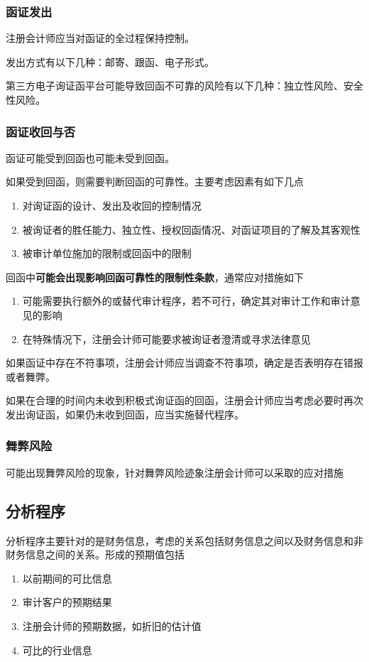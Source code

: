 \documentclass[UTF8,12pt]{ctexart}
\numberwithin{equation}{section} %
\numberwithin{figure}{section}
\numberwithin{table}{section}
\begin{document}
	\subsubsection{函证发出}
	注册会计师应当对函证的全过程保持控制。
	
	发出方式有以下几种：邮寄、跟函、电子形式。
	
	第三方电子询证函平台可能导致回函不可靠的风险有以下几种：独立性风险、安全性风险。
	
	\subsubsection{函证收回与否}
	函证可能受到回函也可能未受到回函。
	
	如果受到回函，则需要判断回函的可靠性。主要考虑因素有如下几点
	\begin{enumerate}
		\item 对询证函的设计、发出及收回的控制情况
		
		\item 被询证者的胜任能力、独立性、授权回函情况、对函证项目的了解及其客观性
		
		\item 被审计单位施加的限制或回函中的限制
	\end{enumerate}
	
	回函中\textbf{可能会出现影响回函可靠性的限制性条款}，通常应对措施如下
	\begin{enumerate}
		\item 可能需要执行额外的或替代审计程序，若不可行，确定其对审计工作和审计意见的影响
		
		\item 在特殊情况下，注册会计师可能要求被询证者澄清或寻求法律意见
	\end{enumerate}
	
	如果函证中存在不符事项，注册会计师应当调查不符事项，确定是否表明存在错报或者舞弊。
	
	如果在合理的时间内未收到积极式询证函的回函，注册会计师应当考虑必要时再次发出询证函，如果仍未收到回函，应当实施替代程序。
	
	\subsubsection{舞弊风险}
	
	可能出现舞弊风险的现象，针对舞弊风险迹象注册会计师可以采取的应对措施
	
	\subsection{分析程序}
	分析程序主要针对的是财务信息，考虑的关系包括财务信息之间以及财务信息和非财务信息之间的关系。形成的预期值包括
	\begin{enumerate}
		\item 以前期间的可比信息
		
		\item 审计客户的预期结果
		
		\item 注册会计师的预期数据，如折旧的估计值
		
		\item 可比的行业信息
	\end{enumerate}
	
\end{document}
